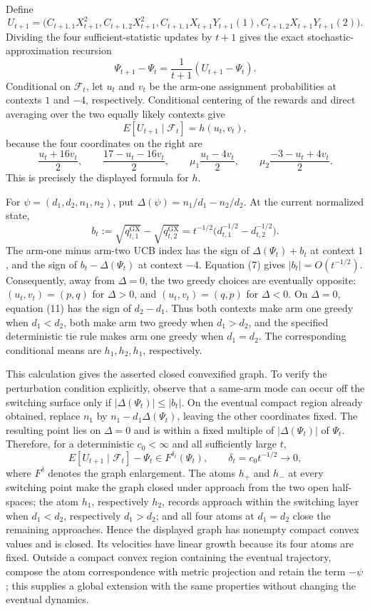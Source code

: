 Define
\[
 U_{t+1}=\bigl(C_{t+1,1}X_{t+1}^2,C_{t+1,2}X_{t+1}^2,
 C_{t+1,1}X_{t+1}Y_{t+1}(1),C_{t+1,2}X_{t+1}Y_{t+1}(2)\bigr).
\]
Dividing the four sufficient-statistic updates by \(t+1\) gives the exact stochastic-approximation recursion
\[
 \Psi_{t+1}-\Psi_t=\frac1{t+1}(U_{t+1}-\Psi_t). \tag{9}
\]
Conditional on \(\mathcal F_t\), let \(u_t\) and \(v_t\) be the arm-one assignment probabilities at contexts \(1\) and \(-4\), respectively.  Conditional centering of the rewards and direct averaging over the two equally likely contexts give
\[
 E[U_{t+1}\mid\mathcal F_t]=h(u_t,v_t), \tag{10}
\]
because the four coordinates on the right are
\[
 \frac{u_t+16v_t}{2},\qquad \frac{17-u_t-16v_t}{2},\qquad
 \mu_1\frac{u_t-4v_t}{2},\qquad
 \mu_2\frac{-3-u_t+4v_t}{2}.
\]
This is precisely the displayed formula for \(h\).

For \(\psi=(d_1,d_2,n_1,n_2)\), put \(\Delta(\psi)=n_1/d_1-n_2/d_2\).  At the current normalized state,
\[
 b_t:=\sqrt{q^{\mathrm{GX}}_{t,1}}-\sqrt{q^{\mathrm{GX}}_{t,2}}
 =t^{-1/2}\bigl(d_{t,1}^{-1/2}-d_{t,2}^{-1/2}\bigr). \tag{11}
\]
The arm-one minus arm-two UCB index has the sign of \(\Delta(\Psi_t)+b_t\) at context \(1\), and the sign of \(b_t-\Delta(\Psi_t)\) at context \(-4\).  Equation (7) gives \(|b_t|=O(t^{-1/2})\).  Consequently, away from \(\Delta=0\), the two greedy choices are eventually opposite: \((u_t,v_t)=(p,q)\) for \(\Delta>0\), and \((u_t,v_t)=(q,p)\) for \(\Delta<0\).  On \(\Delta=0\), equation (11) has the sign of \(d_2-d_1\).  Thus both contexts make arm one greedy when \(d_1<d_2\), both make arm two greedy when \(d_1>d_2\), and the specified deterministic tie rule makes arm one greedy when \(d_1=d_2\).  The corresponding conditional means are \(h_1,h_2,h_1\), respectively.

This calculation gives the asserted closed convexified graph.  To verify the perturbation condition explicitly, observe that a same-arm mode can occur off the switching surface only if \(|\Delta(\Psi_t)|\leq |b_t|\).  On the eventual compact region already obtained, replace \(n_1\) by \(n_1-d_1\Delta(\Psi_t)\), leaving the other coordinates fixed.  The resulting point lies on \(\Delta=0\) and is within a fixed multiple of \(|\Delta(\Psi_t)|\) of \(\Psi_t\).  Therefore, for a deterministic \(c_0<\infty\) and all sufficiently large \(t\),
\[
 E[U_{t+1}\mid\mathcal F_t]-\Psi_t\in F^{\delta_t}(\Psi_t),
 \qquad \delta_t=c_0t^{-1/2}\longrightarrow0, \tag{12}
\]
where \(F^\delta\) denotes the graph enlargement.  The atoms \(h_+\) and \(h_-\) at every switching point make the graph closed under approach from the two open half-spaces; the atom \(h_1\), respectively \(h_2\), records approach within the switching layer when \(d_1<d_2\), respectively \(d_1>d_2\); and all four atoms at \(d_1=d_2\) close the remaining approaches.  Hence the displayed graph has nonempty compact convex values and is closed.  Its velocities have linear growth because its four atoms are fixed.  Outside a compact convex region containing the eventual trajectory, compose the atom correspondence with metric projection and retain the term \(-\psi\); this supplies a global extension with the same properties without changing the eventual dynamics.


